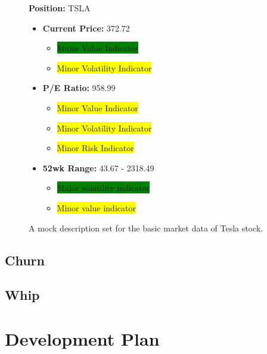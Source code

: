 \documentclass[letterpaper,12pt]{article}
\begin{document}
\begin{figure}
    \begin{center}
    {\large \bf Position:} TSLA
        \begin{itemize}
            \item {\large \bf Current Price:} 372.72
                \begin{itemize}
                    \item \colorbox{green}{Major Value Indicator}
                    \item \colorbox{yellow}{Minor Volatility Indicator}
                \end{itemize}
            \item {\large \bf P/E Ratio:} 958.99
                \begin{itemize}
                    \item \colorbox{yellow}{Minor Value Indicator}
                    \item \colorbox{yellow}{Minor Volatility Indicator}
                    \item \colorbox{yellow}{Minor Risk Indicator}
                \end{itemize}
            \item {\large \bf 52wk Range:} 43.67 - 2318.49
                \begin{itemize}
                    \item \colorbox{green}{Major volatility indicator}
                    \item \colorbox{yellow}{Minor value indicator}
                \end{itemize}
        \end{itemize}
    \caption{A mock description set for the basic market data of Tesla stock.}
    \label{fig:my_label}
    \end{center}
\end{figure}

\subsection{Churn}

\subsection{Whip}

\section{Development Plan}
\end{document}
